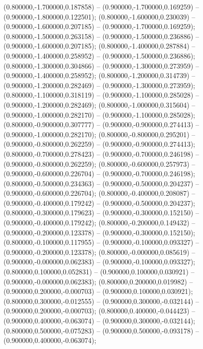  (0.800000,-1.700000,0.187858) -- (0.900000,-1.700000,0.169259) -- (0.900000,-1.800000,0.122501);
 (0.800000,-1.600000,0.230039) -- (0.900000,-1.600000,0.207185) -- (0.900000,-1.700000,0.169259);
 (0.800000,-1.500000,0.263158) -- (0.900000,-1.500000,0.236886) -- (0.900000,-1.600000,0.207185);
 (0.800000,-1.400000,0.287884) -- (0.900000,-1.400000,0.258952) -- (0.900000,-1.500000,0.236886);
 (0.800000,-1.300000,0.304866) -- (0.900000,-1.300000,0.273959) -- (0.900000,-1.400000,0.258952);
 (0.800000,-1.200000,0.314739) -- (0.900000,-1.200000,0.282469) -- (0.900000,-1.300000,0.273959);
 (0.800000,-1.100000,0.318119) -- (0.900000,-1.100000,0.285028) -- (0.900000,-1.200000,0.282469);
 (0.800000,-1.000000,0.315604) -- (0.900000,-1.000000,0.282170) -- (0.900000,-1.100000,0.285028);
 (0.800000,-0.900000,0.307777) -- (0.900000,-0.900000,0.274413) -- (0.900000,-1.000000,0.282170);
 (0.800000,-0.800000,0.295201) -- (0.900000,-0.800000,0.262259) -- (0.900000,-0.900000,0.274413);
 (0.800000,-0.700000,0.278423) -- (0.900000,-0.700000,0.246198) -- (0.900000,-0.800000,0.262259);
 (0.800000,-0.600000,0.257973) -- (0.900000,-0.600000,0.226704) -- (0.900000,-0.700000,0.246198);
 (0.800000,-0.500000,0.234363) -- (0.900000,-0.500000,0.204237) -- (0.900000,-0.600000,0.226704);
 (0.800000,-0.400000,0.208087) -- (0.900000,-0.400000,0.179242) -- (0.900000,-0.500000,0.204237);
 (0.800000,-0.300000,0.179623) -- (0.900000,-0.300000,0.152150) -- (0.900000,-0.400000,0.179242);
 (0.800000,-0.200000,0.149432) -- (0.900000,-0.200000,0.123378) -- (0.900000,-0.300000,0.152150);
 (0.800000,-0.100000,0.117955) -- (0.900000,-0.100000,0.093327) -- (0.900000,-0.200000,0.123378);
 (0.800000,-0.000000,0.085619) -- (0.900000,-0.000000,0.062383) -- (0.900000,-0.100000,0.093327);
 (0.800000,0.100000,0.052831) -- (0.900000,0.100000,0.030921) -- (0.900000,-0.000000,0.062383);
 (0.800000,0.200000,0.019982) -- (0.900000,0.200000,-0.000703) -- (0.900000,0.100000,0.030921);
 (0.800000,0.300000,-0.012555) -- (0.900000,0.300000,-0.032144) -- (0.900000,0.200000,-0.000703);
 (0.800000,0.400000,-0.044423) -- (0.900000,0.400000,-0.063074) -- (0.900000,0.300000,-0.032144);
 (0.800000,0.500000,-0.075283) -- (0.900000,0.500000,-0.093178) -- (0.900000,0.400000,-0.063074);
